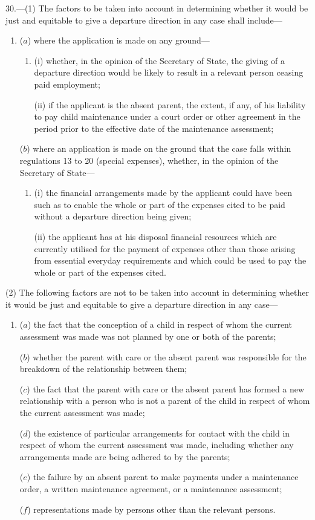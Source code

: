 \documentclass[12pt,a4paper]{article}
\begin{document}
30.—(1) The factors to be taken into account in determining whether it
would be just and equitable to give a departure direction in any case shall
include—
\begin{enumerate}\item[]
($a$) where the application is made on any ground—
\begin{enumerate}\item[]
(i) whether, in the opinion of the Secretary of State, the giving of a departure
direction would be likely to result in a relevant person ceasing paid
employment;

(ii) if the applicant is the absent parent, the extent, if any, of his liability
to pay child maintenance under a court order or other agreement in the period
prior to the effective date of the maintenance assessment;
\end{enumerate}

($b$) where an application is made on the ground that the case falls within
regulations 13 to 20 (special expenses), whether, in the opinion of the
Secretary of State—
\begin{enumerate}\item[]
(i) the financial arrangements made by the applicant could have been such as to
enable the whole or part of the expenses cited to be paid without a departure
direction being given;

(ii) the applicant has at his disposal financial resources which are currently
utilised for the payment of expenses other than those arising from essential
everyday requirements and which could be used to pay the whole or part of the
expenses cited.
\end{enumerate}
\end{enumerate}

(2) The following factors are not to be taken into account in determining
whether it would be just and equitable to give a departure direction in any
case—
\begin{enumerate}\item[]
($a$) the fact that the conception of a child in respect of whom the current
assessment was made was not planned by one or both of the parents;

($b$) whether the parent with care or the absent parent was responsible for the
breakdown of the relationship between them;

($c$) the fact that the parent with care or the absent parent has formed a new
relationship with a person who is not a parent of the child in respect of whom
the current assessment was made;

($d$) the existence of particular arrangements for contact with the child in
respect of whom the current assessment was made, including whether any
arrangements made are being adhered to by the parents;

($e$) the failure by an absent parent to make payments under a maintenance order, a
written maintenance agreement, or a maintenance assessment;

($f$) representations made by persons other than the relevant persons.
\end{enumerate}
\end{document}
